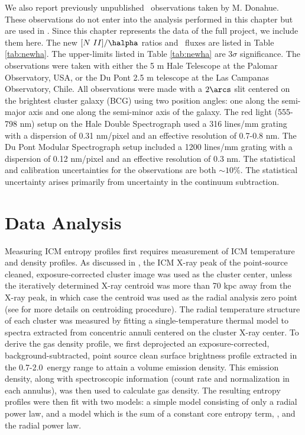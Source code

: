 We also report previously unpublished \halpha\ observations taken by
M. Donahue. These observations do not enter into the analysis
performed in this chapter but are used in \citet{haradent}. Since this
chapter represents the data of the full project, we include them
here. The new $[N~II]/\halpha$ ratios and \halpha\ fluxes are listed
in Table \ref{tab:newha}. The upper-limits listed in Table
\ref{tab:newha} are $3\sigma$ significance. The observations were
taken with either the 5 m Hale Telescope at the Palomar Observatory,
USA, or the Du Pont 2.5 m telescope at the Las Campanas Observatory,
Chile. All observations were made with a $2\arcs$ slit centered on the
brightest cluster galaxy (BCG) using two position angles: one along
the semi-major axis and one along the semi-minor axis of the
galaxy. The red light (555-798 nm) setup on the Hale Double
Spectrograph used a 316 lines/mm grating with a dispersion of 0.31
nm/pixel and an effective resolution of 0.7-0.8 nm. The Du Pont
Modular Spectrograph setup included a 1200 lines/mm grating with a
dispersion of 0.12 nm/pixel and an effective resolution of 0.3 nm. The
statistical and calibration uncertainties for the observations are
both $\sim 10\%$. The statistical uncertainty arises primarily from
uncertainty in the continuum subtraction.

\section{Data Analysis}
\label{sec:entsuppdata}

Measuring ICM entropy profiles first requires measurement of ICM
temperature and density profiles. As discussed in \citet{xrayband},
the ICM X-ray peak of the point-source cleaned, exposure-corrected
cluster image was used as the cluster center, unless the iteratively
determined X-ray centroid was more than 70 kpc away from the X-ray
peak, in which case the centroid was used as the radial analysis
zero point (see \cite{xrayband} for more details on centroiding
procedure). The radial temperature structure of each cluster was
measured by fitting a single-temperature thermal model to spectra
extracted from concentric annuli centered on the cluster X-ray
center. To derive the gas density profile, we first deprojected an
exposure-corrected, background-subtracted, point source clean surface
brightness profile extracted in the 0.7-2.0\keV\ energy range to
attain a volume emission density. This emission density, along with
spectroscopic information (count rate and normalization in each
annulus), was then used to calculate gas density. The resulting
entropy profiles were then fit with two models: a simple model
consisting of only a radial power law, and a model which is the sum of
a constant core entropy term, \kna, and the radial power law.

